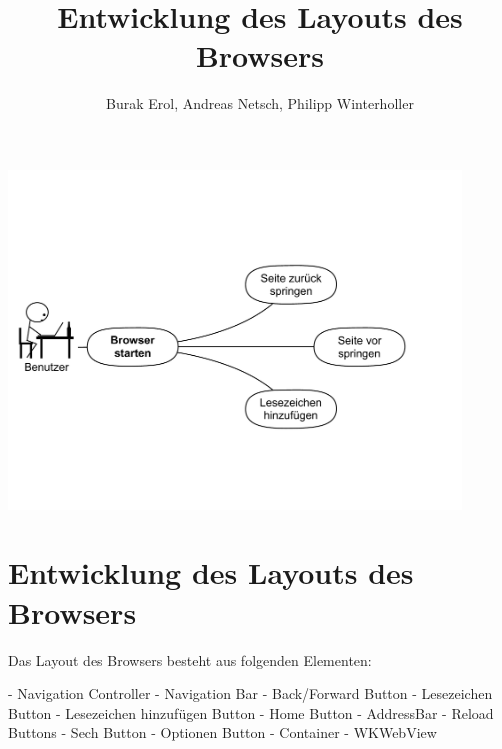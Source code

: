 
\title{Entwicklung des Layouts des Browsers}
\author{Burak Erol, Andreas Netsch, Philipp Winterholler}

\includegraphics[width=12cm]{Pics/use_case_browser}

\section{Entwicklung des Layouts des Browsers}

Das Layout des Browsers besteht aus folgenden Elementen:

- Navigation Controller
- Navigation Bar
	- Back/Forward Button
	- Lesezeichen Button
	- Lesezeichen hinzufügen Button
	- Home Button
	- AddressBar
	- Reload Buttons
	- Sech Button
	- Optionen Button
	- Container
	- WKWebView

